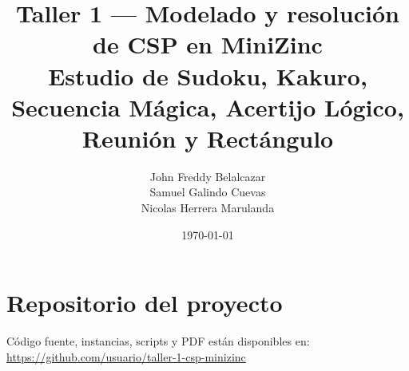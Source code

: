 \documentclass[11pt,a4paper]{article}
\title{Taller 1 — Modelado y resolución de CSP en MiniZinc\\
\large Estudio de Sudoku, Kakuro, Secuencia Mágica, Acertijo Lógico, Reunión y Rectángulo}
\author{John Freddy Belalcazar \\ Samuel Galindo Cuevas \\ Nicolas Herrera Marulanda}
\date{\today}
\begin{document}
\maketitle
\tableofcontents

\section*{Repositorio del proyecto}
Código fuente, instancias, scripts y PDF están disponibles en: {\url{https://github.com/usuario/taller-1-csp-minizinc}}










































\end{document}
